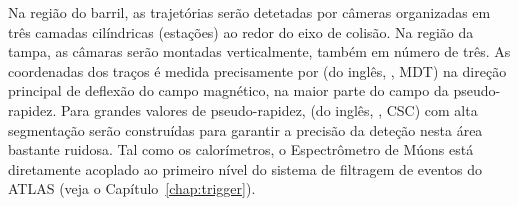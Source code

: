 Na região do barril, as trajetórias serão detetadas por câmeras organizadas em
três camadas cilíndricas (estações) ao redor do eixo de colisão. Na região da
tampa, as câmaras serão montadas verticalmente, também em número de três. As
coordenadas dos traços é medida precisamente por  (do inglês, , MDT) na direção
principal de deflexão do campo magnético, na maior parte do campo da
pseudo-rapidez. Para grandes valores de pseudo-rapidez,  (do inglês, , CSC) com
alta segmentação serão construídas para garantir a precisão da deteção nesta
área bastante ruidosa. Tal como os calorímetros, o Espectrômetro de Múons está
diretamente acoplado ao primeiro nível do sistema de filtragem de eventos do
ATLAS (veja o Capítulo~\ref{chap:trigger}).

